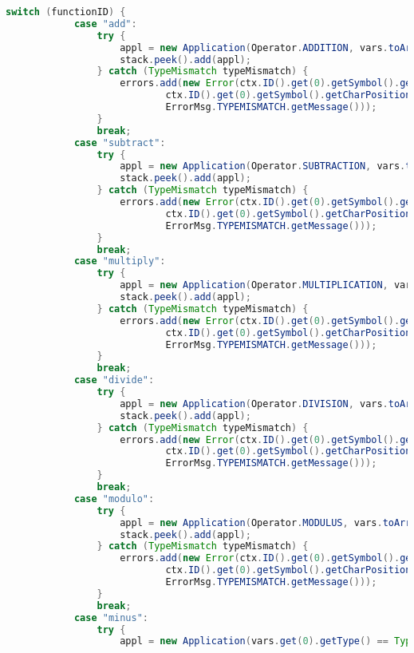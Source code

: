 \begin{landscape}
\begin{lstlisting}[language=Java]
        switch (functionID) {
            case "add":
                try {
                    appl = new Application(Operator.ADDITION, vars.toArray(varArr));
                    stack.peek().add(appl);
                } catch (TypeMismatch typeMismatch) {
                    errors.add(new Error(ctx.ID().get(0).getSymbol().getLine(),
                            ctx.ID().get(0).getSymbol().getCharPositionInLine(),
                            ErrorMsg.TYPEMISMATCH.getMessage()));
                }
                break;
            case "subtract":
                try {
                    appl = new Application(Operator.SUBTRACTION, vars.toArray(varArr));
                    stack.peek().add(appl);
                } catch (TypeMismatch typeMismatch) {
                    errors.add(new Error(ctx.ID().get(0).getSymbol().getLine(),
                            ctx.ID().get(0).getSymbol().getCharPositionInLine(),
                            ErrorMsg.TYPEMISMATCH.getMessage()));
                }
                break;
            case "multiply":
                try {
                    appl = new Application(Operator.MULTIPLICATION, vars.toArray(varArr));
                    stack.peek().add(appl);
                } catch (TypeMismatch typeMismatch) {
                    errors.add(new Error(ctx.ID().get(0).getSymbol().getLine(),
                            ctx.ID().get(0).getSymbol().getCharPositionInLine(),
                            ErrorMsg.TYPEMISMATCH.getMessage()));
                }
                break;
            case "divide":
                try {
                    appl = new Application(Operator.DIVISION, vars.toArray(varArr));
                    stack.peek().add(appl);
                } catch (TypeMismatch typeMismatch) {
                    errors.add(new Error(ctx.ID().get(0).getSymbol().getLine(),
                            ctx.ID().get(0).getSymbol().getCharPositionInLine(),
                            ErrorMsg.TYPEMISMATCH.getMessage()));
                }
                break;
            case "modulo":
                try {
                    appl = new Application(Operator.MODULUS, vars.toArray(varArr));
                    stack.peek().add(appl);
                } catch (TypeMismatch typeMismatch) {
                    errors.add(new Error(ctx.ID().get(0).getSymbol().getLine(),
                            ctx.ID().get(0).getSymbol().getCharPositionInLine(),
                            ErrorMsg.TYPEMISMATCH.getMessage()));
                }
                break;
            case "minus":
                try {
                    appl = new Application(vars.get(0).getType() == Type.BOOL ? Operator.NOT : Operator.UMINUS, vars.toArray(varArr));

\end{lstlisting}
\end{landscape}
